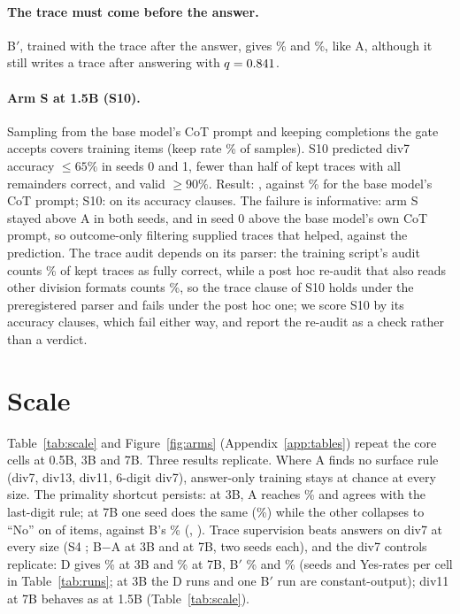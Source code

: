 \documentclass{article}
\theoremstyle{definition}
\begin{document}
\paragraph{The trace must come before the answer.} B$'$, trained with the trace after the answer, gives \divsevenBpsZero\% and \divsevenBpsOne\%, like A, although it still writes a trace after answering with $q=0.841$.

\paragraph{Arm S at 1.5B (S10).} Sampling from the base model's CoT prompt and keeping completions the gate accepts covers \selfKept{} training items (keep rate \selfKeep\% of samples). S10 predicted div7 accuracy $\le 65\%$ in seeds 0 and 1, fewer than half of kept traces with all remainders correct, and valid $\ge 90\%$. Result: \STenResult, against \divsevenCot\% for the base model's CoT prompt; S10: \verdictSTen{} on its accuracy clauses. The failure is informative: arm S stayed above A in both seeds, and in seed 0 above the base model's own CoT prompt, so outcome-only filtering supplied traces that helped, against the prediction. The trace audit depends on its parser: the training script's audit counts \selfCorrectAll\% of kept traces as fully correct, while a post hoc re-audit that also reads other division formats counts \selfCorrectAllExt\%, so the trace clause of S10 holds under the preregistered parser and fails under the post hoc one; we score S10 by its accuracy clauses, which fail either way, and report the re-audit as a check rather than a verdict.


\section{Scale}
\label{sec:scale}
Table~\ref{tab:scale} and Figure~\ref{fig:arms} (Appendix~\ref{app:tables}) repeat the core cells at 0.5B, 3B and 7B. Three results replicate. Where A finds no surface rule (div7, div13, div11, 6-digit div7), answer-only training stays at chance at every size. The primality shortcut persists: at 3B, A reaches \threeBprimeA\% and agrees with the last-digit rule; at 7B one seed does the same (\sevenBprimeAsOne\%) while the other collapses to ``No'' on \sevenBprimeAsZeroNo{} of \nTest{} items, against B's \sevenBprimeB\% (\sevenBprimeBsZero, \sevenBprimeBsOne). Trace supervision beats answers on div7 at every size (S4 \verdictSFour; B$-$A \threeBdivsevenBootBADiff{} \threeBdivsevenBootBACi{} at 3B and \sevenBdivsevenBootBADiff{} \sevenBdivsevenBootBACi{} at 7B, two seeds each), and the div7 controls replicate: D gives \threeBdivsevenD\% at 3B and \sevenBdivsevenD\% at 7B, B$'$ \threeBdivsevenBp\% and \sevenBdivsevenBp\% (seeds and Yes-rates per cell in Table~\ref{tab:runs}; at 3B the D runs and one B$'$ run are constant-output); div11 at 7B behaves as at 1.5B (Table~\ref{tab:scale}).
\end{document}
